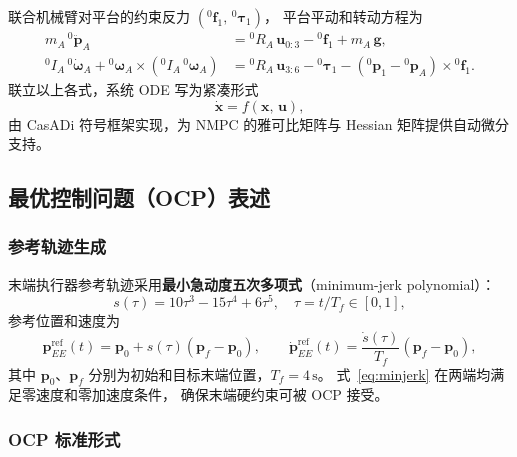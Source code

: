 联合机械臂对平台的约束反力 $({}^{0}\mathbf{f}_1,\,{}^{0}\boldsymbol{\tau}_1)$，
平台平动和转动方程为
\begin{align}
    m_A\,{}^{0}\ddot{\mathbf{p}}_A &= {}^{0}R_A\,\mathbf{u}_{0:3}
    - {}^{0}\mathbf{f}_1 + m_A\,\mathbf{g},
    \label{eq:platform_trans}\\
    {}^{0}I_A\,{}^{0}\dot{\boldsymbol{\omega}}_A
    + {}^{0}\boldsymbol{\omega}_A\times({}^{0}I_A\,{}^{0}\boldsymbol{\omega}_A)
    &= {}^{0}R_A\,\mathbf{u}_{3:6}
    - {}^{0}\boldsymbol{\tau}_1
    - ({}^{0}\mathbf{p}_1 - {}^{0}\mathbf{p}_A)\times{}^{0}\mathbf{f}_1.
    \label{eq:platform_rot}
\end{align}
联立以上各式，系统 ODE 写为紧凑形式
\begin{equation}
    \dot{\mathbf{x}} = f(\mathbf{x},\,\mathbf{u}),
    \label{eq:ode}
\end{equation}
由 CasADi 符号框架实现，为 NMPC 的雅可比矩阵与 Hessian 矩阵提供自动微分支持。

\subsection{最优控制问题（OCP）表述}

\subsubsection{参考轨迹生成}

末端执行器参考轨迹采用\textbf{最小急动度五次多项式}（minimum-jerk polynomial）：
\begin{equation}
    s(\tau) = 10\tau^3 - 15\tau^4 + 6\tau^5,\quad \tau = t/T_f \in [0,1],
    \label{eq:minjerk}
\end{equation}
参考位置和速度为
\begin{equation}
    \mathbf{p}^{\mathrm{ref}}_{EE}(t) = \mathbf{p}_0 + s(\tau)(\mathbf{p}_f - \mathbf{p}_0),
    \qquad
    \dot{\mathbf{p}}^{\mathrm{ref}}_{EE}(t)
    = \frac{\dot{s}(\tau)}{T_f}(\mathbf{p}_f - \mathbf{p}_0),
\end{equation}
其中 $\mathbf{p}_0$、$\mathbf{p}_f$ 分别为初始和目标末端位置，$T_f = 4\,\mathrm{s}$。
式~\eqref{eq:minjerk} 在两端均满足零速度和零加速度条件，
确保末端硬约束可被 OCP 接受。

\subsubsection{OCP 标准形式}

